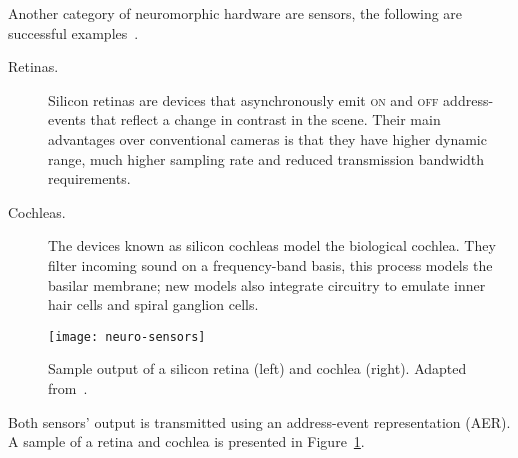 \begin{description}

\end{description}


Another category of neuromorphic hardware are sensors, the following are successful examples~\cite{liu2010neuromorphic}.
\begin{description}
  \item[Retinas.] Silicon retinas are devices that asynchronously emit \textsc{on} and \textsc{off} address-events that reflect a change in contrast in the scene. Their main advantages over conventional cameras is that they have higher dynamic range, much higher sampling rate and reduced transmission bandwidth requirements.
  \item[Cochleas.] The devices known as silicon cochleas model the biological cochlea. They filter incoming sound on a frequency-band basis, this process models the basilar membrane; new models also integrate circuitry to emulate inner hair cells and spiral ganglion cells.
\end{description}

\begin{figure}[h]
  \begin{center}
    \texttt{[image: neuro-sensors]}
    \caption{Sample output of a silicon retina (left) and cochlea (right). Adapted from~\cite{liu2010neuromorphic}.}
    \label{fig:neuro:retina-cochlea}
  \end{center}
\end{figure}
Both sensors' output is transmitted using an address-event representation (AER). A sample of a retina and cochlea is presented in Figure~\ref{fig:neuro:retina-cochlea}.